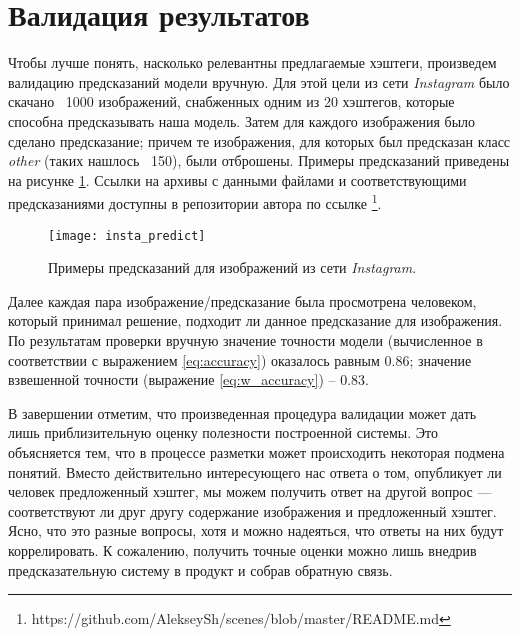 \section{Валидация результатов}


\indent
\indent
Чтобы лучше понять, насколько релевантны предлагаемые хэштеги,
произведем валидацию предсказаний модели вручную. Для этой цели 
из сети \textit{Instagram} было скачано ~1000 изображений, снабженных
одним из 20 хэштегов, которые способна предсказывать наша модель. Затем для 
каждого изображения было сделано предсказание; причем те изображения,
для которых был предсказан класс \textit{other} (таких нашлось ~150),
были отброшены. Примеры предсказаний 
приведены на рисунке \ref{tikzpicture: insta_predict}.
Ссылки на архивы с данными файлами и 
соответствующими предсказаниями доступны в репозитории автора по
ссылке
\footnote{https://github.com/AlekseySh/scenes/blob/master/README.md}.
 

\begin{figure}[h!]
    \begin{center}
   	    \texttt{[image: insta\_predict]}
   	\end{center}
   	\caption{Примеры предсказаний для изображений из сети \textit{Instagram}.}
   	\label{tikzpicture: insta_predict}
\end{figure}


\indent
\indent
Далее каждая пара изображение/предсказание была просмотрена человеком,
который принимал решение, подходит ли данное предсказание для изображения.
По результатам проверки вручную значение точности модели
(вычисленное в соответствии 
с выражением \ref{eq:accuracy}) оказалось равным 0.86; 
значение взвешенной точности (выражение \ref{eq:w_accuracy}) -- 0.83.



\indent
\indent
В завершении отметим, что произведенная процедура валидации может дать лишь
приблизительную оценку полезности построенной системы. Это объясняется
тем, что в процессе разметки может происходить некоторая подмена понятий.
Вместо действительно интересующего нас ответа о том, опубликует ли человек 
предложенный хэштег, мы можем получить ответ на другой вопрос --- 
соответствуют ли друг другу содержание изображения 
и предложенный хэштег. Ясно, что это разные вопросы, хотя и можно надеяться,
что ответы на них будут коррелировать.
К сожалению, получить точные оценки можно лишь внедрив 
предсказательную систему в продукт и собрав обратную связь.